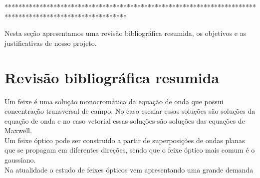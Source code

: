 ***********************************************************************************************************  


Nesta seção apresentamos  uma revisão bibliográfica resumida, os objetivos e as justificativas  de nosso projeto.
\section{Revisão bibliográfica resumida}
Um feixe é uma solução monocromática da equação de onda que possui concentração transversal de campo. No caso escalar essas soluções são soluções da equação de onda e no caso vetorial essas soluções são soluções das equações de Maxwell.\\
Um feixe óptico pode ser construído a partir de superposições de ondas planas que se propagam em diferentes direções, sendo que o feixe óptico mais comum é o gaussiano.\\
Na atualidade o estudo de feixes ópticos vem apresentando uma grande demanda 
